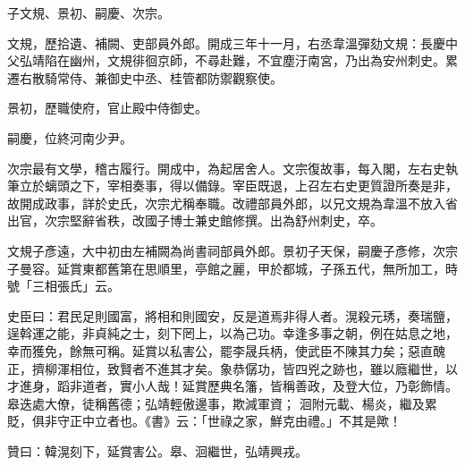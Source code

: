 \begin{pinyinscope}
 子文規、景初、嗣慶、次宗。



 文規，歷拾遺、補闕、吏部員外郎。開成三年十一月，右丞韋溫彈劾文規：長慶中父弘靖陷在幽州，文規徘徊京師，不尋赴難，不宜塵汙南宮，乃出為安州刺史。累遷右散騎常侍、兼御史中丞、桂管都防禦觀察使。



 景初，歷職使府，官止殿中侍御史。



 嗣慶，位終河南少尹。



 次宗最有文學，稽古履行。開成中，為起居舍人。文宗復故事，每入閣，左右史執
 筆立於螭頭之下，宰相奏事，得以備錄。宰臣既退，上召左右史更質證所奏是非，故開成政事，詳於史氏，次宗尤稱奉職。改禮部員外郎，以兄文規為韋溫不放入省出官，次宗堅辭省秩，改國子博士兼史館修撰。出為舒州刺史，卒。



 文規子彥遠，大中初由左補闕為尚書祠部員外郎。景初子天保，嗣慶子彥修，次宗子曼容。延賞東都舊第在思順里，亭館之麗，甲於都城，子孫五代，無所加工，時號「三相張氏」云。



 史臣曰：君民足則國富，將相和則國安，反是道焉非得人者。滉殺元琇，奏瑞鹽，逞斡運之能，非貞純之士，刻下罔上，以為己功。幸逢多事之朝，例在姑息之地，幸而獲免，餘無可稱。延賞以私害公，罷李晟兵柄，使武臣不陳其力矣；惡直醜正，擠柳渾相位，致賢者不進其才矣。象恭僝功，皆四兇之跡也，雖以廕繼世，以才進身，蹈非道者，實小人哉！延賞歷典名籓，皆稱善政，及登大位，乃彰飾情。皋迭處大僚，徒稱舊德；弘靖輕傲邊事，欺減軍資；
 洄附元載、楊炎，繼及累貶，俱非守正中立者也。《書》云：「世祿之家，鮮克由禮。」不其是歟！



 贊曰：韓滉刻下，延賞害公。皋、洄繼世，弘靖興戎。



\end{pinyinscope}